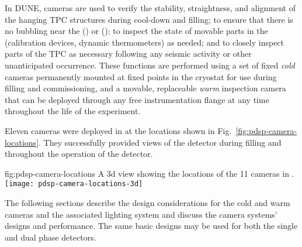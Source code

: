 In DUNE, cameras are used to verify the stability, straightness,
and alignment of the hanging TPC structures during cool-down and
filling; to ensure that there is no bubbling near the 
(\single) or  (\dual); to inspect the
state of movable parts in the  (calibration devices, dynamic
thermometers) as needed; and to closely inspect parts of the TPC as
necessary following any seismic activity or other unanticipated
occurrence.  These functions are performed using a set of fixed
\textit{cold} cameras permanently mounted at fixed points in the cryostat
for use during filling and commissioning, and a movable, replaceable
\textit{warm} inspection camera that can be deployed through any free
instrumentation flange at any time throughout the life of the
experiment. 

Eleven cameras were deployed in  at the locations shown in Fig.~\ref{fig:pdsp-camera-locations}. They successfully provided views of the detector during filling and throughout the operation of the detector.

\begin{dunefigure}{fig:pdsp-camera-locations}
  {A 3d view showing the locations of the 11 cameras in .}
  \texttt{[image: pdsp-camera-locations-3d]}%
\end{dunefigure}

The following sections describe the design considerations for the cold
and warm cameras and the associated lighting system and discuss the  camera systems' designs and performance.  
The same basic
designs may be used for both the single and dual phase detectors.

